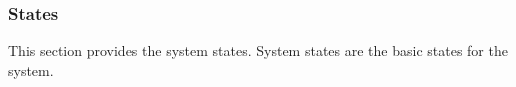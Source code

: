 
\newpage
\subsubsection{States}
\renewcommand{\RqtNumberBase}{\getcurrentref{subsubsection}}

This section provides the system states.
System states are the basic states for the system.

